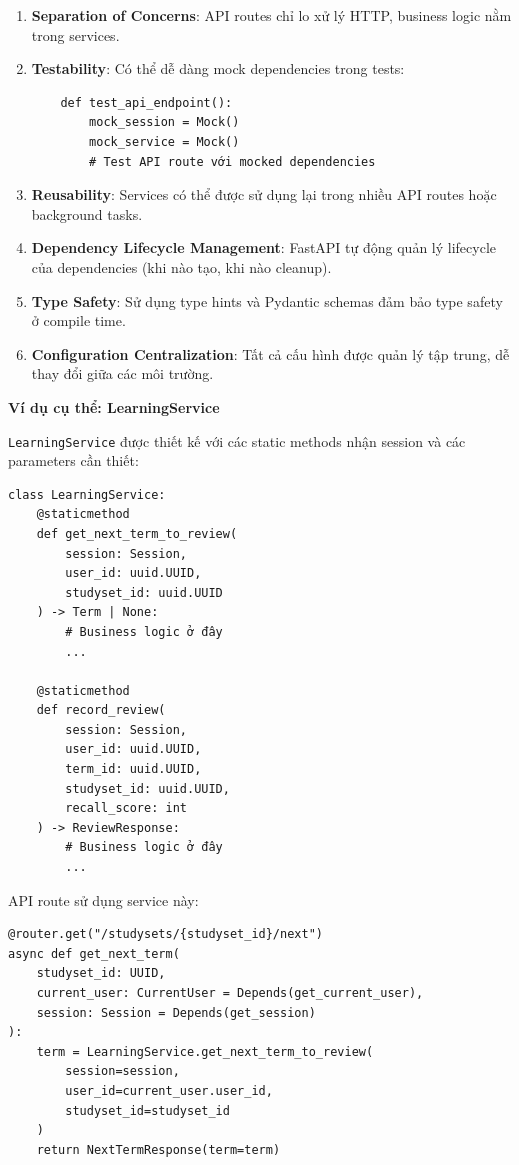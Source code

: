 \documentclass[../DoAn.tex]{subfiles}
\begin{document}
\begin{enumerate}
    \item \textbf{Separation of Concerns}: API routes chỉ lo xử lý HTTP, business logic nằm trong services.
    
    \item \textbf{Testability}: Có thể dễ dàng mock dependencies trong tests:
    \begin{verbatim}
    def test_api_endpoint():
        mock_session = Mock()
        mock_service = Mock()
        # Test API route với mocked dependencies
    \end{verbatim}
    
    \item \textbf{Reusability}: Services có thể được sử dụng lại trong nhiều API routes hoặc background tasks.
    
    \item \textbf{Dependency Lifecycle Management}: FastAPI tự động quản lý lifecycle của dependencies (khi nào tạo, khi nào cleanup).
    
    \item \textbf{Type Safety}: Sử dụng type hints và Pydantic schemas đảm bảo type safety ở compile time.
    
    \item \textbf{Configuration Centralization}: Tất cả cấu hình được quản lý tập trung, dễ thay đổi giữa các môi trường.
\end{enumerate}

\textbf{Ví dụ cụ thể: LearningService}

\texttt{LearningService} được thiết kế với các static methods nhận session và các parameters cần thiết:

\begin{verbatim}
class LearningService:
    @staticmethod
    def get_next_term_to_review(
        session: Session,
        user_id: uuid.UUID,
        studyset_id: uuid.UUID
    ) -> Term | None:
        # Business logic ở đây
        ...
    
    @staticmethod
    def record_review(
        session: Session,
        user_id: uuid.UUID,
        term_id: uuid.UUID,
        studyset_id: uuid.UUID,
        recall_score: int
    ) -> ReviewResponse:
        # Business logic ở đây
        ...
\end{verbatim}

API route sử dụng service này:

\begin{verbatim}
@router.get("/studysets/{studyset_id}/next")
async def get_next_term(
    studyset_id: UUID,
    current_user: CurrentUser = Depends(get_current_user),
    session: Session = Depends(get_session)
):
    term = LearningService.get_next_term_to_review(
        session=session,
        user_id=current_user.user_id,
        studyset_id=studyset_id
    )
    return NextTermResponse(term=term)
\end{verbatim}
\end{document}
